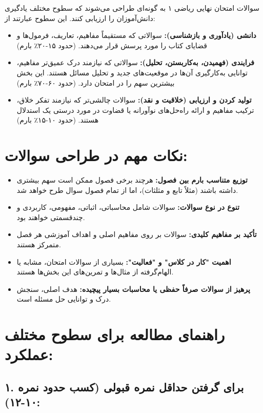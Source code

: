 \documentclass[12pt,a4paper]{article}
\begin{document}
سوالات امتحان نهایی ریاضی ۱ به گونه‌ای طراحی می‌شوند که سطوح مختلف یادگیری دانش‌آموزان را ارزیابی کنند. این سطوح عبارتند از:

\begin{itemize}
    \item \textbf{دانشی (یادآوری و بازشناسی):} سوالاتی که مستقیماً مفاهیم، تعاریف، فرمول‌ها و قضایای کتاب را مورد پرسش قرار می‌دهند. (حدود ۱۵-۲۰٪ بارم)
    \item \textbf{فرایندی (فهمیدن، به‌کاربستن، تحلیل):} سوالاتی که نیازمند درک عمیق‌تر مفاهیم، توانایی به‌کارگیری آن‌ها در موقعیت‌های جدید و تحلیل مسائل هستند. این بخش بیشترین سهم را در امتحان دارد. (حدود ۶۰-۷۰٪ بارم)
    \item \textbf{تولید کردن و ارزیابی (خلاقیت و نقد):} سوالات چالشی‌تر که نیازمند تفکر خلاق، ترکیب مفاهیم و ارائه راه‌حل‌های نوآورانه یا قضاوت در مورد درستی یک استدلال هستند. (حدود ۱۰-۱۵٪ بارم)
\end{itemize}

\section*{نکات مهم در طراحی سوالات:}

\begin{itemize}
    \item \textbf{توزیع متناسب بارم بین فصول:} هرچند برخی فصول ممکن است سهم بیشتری داشته باشند (مثلاً تابع و مثلثات)، اما از تمام فصول سوال طرح خواهد شد.
    \item \textbf{تنوع در نوع سوالات:} سوالات شامل محاسباتی، اثباتی، مفهومی، کاربردی و چندقسمتی خواهند بود.
    \item \textbf{تأکید بر مفاهیم کلیدی:} سوالات بر روی مفاهیم اصلی و اهداف آموزشی هر فصل متمرکز هستند.
    \item \textbf{اهمیت "کار در کلاس" و "فعالیت":} بسیاری از سوالات امتحان، مشابه یا الهام‌گرفته از مثال‌ها و تمرین‌های این بخش‌ها هستند.
    \item \textbf{پرهیز از سوالات صرفاً حفظی یا محاسبات بسیار پیچیده:} هدف اصلی، سنجش درک و توانایی حل مسئله است.
\end{itemize}

\section*{راهنمای مطالعه برای سطوح مختلف عملکرد:}

\subsection*{۱. برای گرفتن حداقل نمره قبولی (کسب حدود نمره ۱۰-۱۲):}
\end{document}
